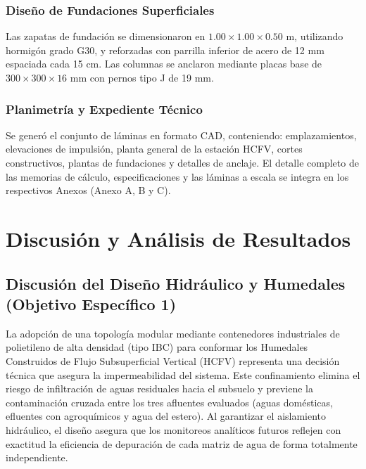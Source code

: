\documentclass[12pt, letterpaper]{report}
\begin{document}
\subsection{Diseño de Fundaciones Superficiales}
Las zapatas de fundación se dimensionaron en $1.00 \times 1.00 \times 0.50\text{ m}$, utilizando hormigón grado G30, y reforzadas con parrilla inferior de acero de 12 mm espaciada cada 15 cm. Las columnas se anclaron mediante placas base de $300 \times 300 \times 16\text{ mm}$ con pernos tipo J de 19 mm. 

\subsection{Planimetría y Expediente Técnico}
Se generó el conjunto de láminas en formato CAD, conteniendo: emplazamientos, elevaciones de impulsión, planta general de la estación HCFV, cortes constructivos, plantas de fundaciones y detalles de anclaje. El detalle completo de las memorias de cálculo, especificaciones y las láminas a escala se integra en los respectivos Anexos (Anexo A, B y C).


\chapter{Discusión y Análisis de Resultados}

\section{Discusión del Diseño Hidráulico y Humedales (Objetivo Específico 1)}
La adopción de una topología modular mediante contenedores industriales de polietileno de alta densidad (tipo IBC) para conformar los Humedales Construidos de Flujo Subsuperficial Vertical (HCFV) representa una decisión técnica que asegura la impermeabilidad del sistema. Este confinamiento elimina el riesgo de infiltración de aguas residuales hacia el subsuelo y previene la contaminación cruzada entre los tres afluentes evaluados (aguas domésticas, efluentes con agroquímicos y agua del estero). Al garantizar el aislamiento hidráulico, el diseño asegura que los monitoreos analíticos futuros reflejen con exactitud la eficiencia de depuración de cada matriz de agua de forma totalmente independiente.
\end{document}
